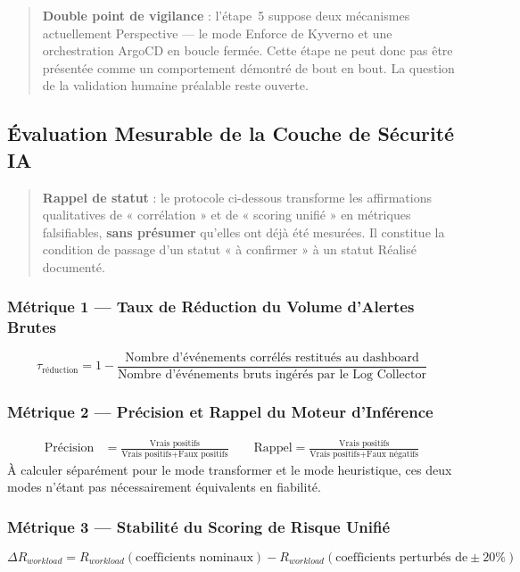 \begin{quote}
\textbf{Double point de vigilance} : l'étape~5 suppose deux mécanismes actuellement Perspective — le mode Enforce de Kyverno et une orchestration ArgoCD en boucle fermée. Cette étape ne peut donc pas être présentée comme un comportement démontré de bout en bout. La question de la validation humaine préalable reste ouverte.
\end{quote}

\subsection{Évaluation Mesurable de la Couche de Sécurité IA}
\label{sec:ia_evaluation_mesurable}

\begin{quote}
\textbf{Rappel de statut} : le protocole ci-dessous transforme les affirmations qualitatives de « corrélation » et de « scoring unifié » en métriques falsifiables, \textbf{sans présumer} qu'elles ont déjà été mesurées. Il constitue la condition de passage d'un statut « à confirmer » à un statut Réalisé documenté.
\end{quote}

\subsubsection{Métrique 1 — Taux de Réduction du Volume d'Alertes Brutes}
\begin{equation}
\tau_{\text{réduction}} = 1 - \frac{\text{Nombre d'événements corrélés restitués au dashboard}}{\text{Nombre d'événements bruts ingérés par le Log Collector}}
\end{equation}

\subsubsection{Métrique 2 — Précision et Rappel du Moteur d'Inférence}
\begin{align*}
\text{Précision} &= \frac{\text{Vrais positifs}}{\text{Vrais positifs} + \text{Faux positifs}} \qquad
\text{Rappel} = \frac{\text{Vrais positifs}}{\text{Vrais positifs} + \text{Faux négatifs}}
\end{align*}
À calculer séparément pour le mode transformer et le mode heuristique, ces deux modes n'étant pas nécessairement équivalents en fiabilité.

\subsubsection{Métrique 3 — Stabilité du Scoring de Risque Unifié}
\begin{equation}
\Delta R_{workload} = R_{workload}(\text{coefficients nominaux}) - R_{workload}(\text{coefficients perturbés de} \pm 20\%)
\end{equation}

